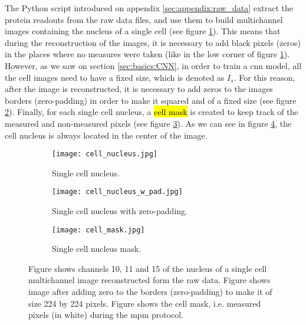 The Python script introduced on appendix \ref{sec:appendix:raw_data} extract the protein readouts from the raw data files, and use them to build multichannel images containing the nucleus of a single cell (see figure \ref{fig:data_pp:sample_cell:nucleus}). This means that during the reconstruction of the images, it is necessary to add black pixels (zeros) in the places where no measures were taken (like in the low corner of figure \ref{fig:data_pp:sample_cell:nucleus}). However, as we saw on section \ref{sec:basics:CNN}, in order to train a \gls{cnn} model, all the cell images need to have a fixed size, which is denoted as $I_s$. For this reason, after the image is reconstructed, it is necessary to add zeros to the images borders (zero-padding) in order to make it squared and of a fixed size (see figure \ref{fig:data_pp:sample_cell:nucleus_pad}). Finally, for each single cell nucleus, a \hl{cell mask} is created to keep track of the measured and non-measured pixels (see figure \ref{fig:data_pp:sample_cell:cell_mask}). As we can see in figure \ref{fig:data_pp:sample_cell}, the cell nucleus is always located in the center of the image.

\begin{figure}[htb]
  \centering
  \begin{subfigure}[t]{.211\linewidth}
    \texttt{[image: cell\_nucleus.jpg]}
    \caption{Single cell nucleus.}
    \label{fig:data_pp:sample_cell:nucleus}
  \end{subfigure}
  \hspace{4mm}
  \begin{subfigure}[t]{.3\linewidth}
    \texttt{[image: cell\_nucleus\_w\_pad.jpg]}
    \caption{Single cell nucleus with zero-padding.}
    \label{fig:data_pp:sample_cell:nucleus_pad}
  \end{subfigure}
  \hspace{4mm}
  \begin{subfigure}[t]{.3\linewidth}
    \texttt{[image: cell\_mask.jpg]}
    \caption{Single cell nucleus mask.}
    \label{fig:data_pp:sample_cell:cell_mask}
  \end{subfigure}
  \caption{Figure  shows channels 10, 11 and 15 of the nucleus of a single cell multichannel image reconstructed form the raw data. Figure  shows image  after adding zero to the borders (zero-padding) to make it of size 224 by 224 pixels. Figure  shows the cell mask, i.e. measured pixels (in white) during the \gls{mpm} protocol.}
  \label{fig:data_pp:sample_cell}
\end{figure}

